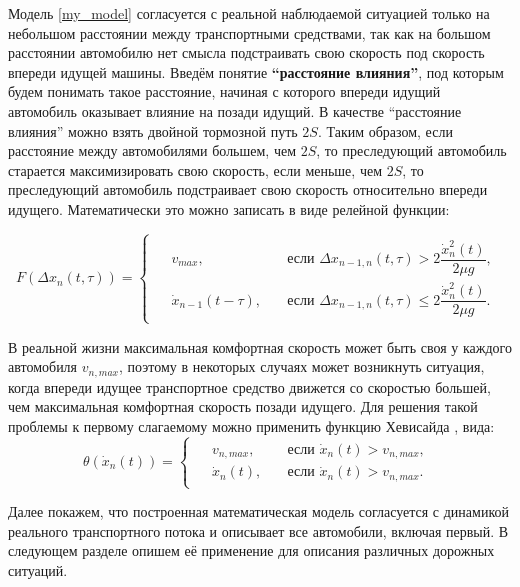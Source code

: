 \documentclass[12pt, a4paper]{extarticle}
\numberwithin{equation}{section}
\numberwithin{figure}{section}
\begin{document}
Модель \eqref{my_model} согласуется с реальной наблюдаемой ситуацией только на небольшом расстоянии между транспортными средствами, так как на большом расстоянии автомобилю нет смысла подстраивать свою скорость под скорость впереди идущей машины. Введём понятие \textbf{``расстояние влияния''}, под которым будем понимать такое расстояние, начиная с которого впереди идущий автомобиль оказывает влияние на позади идущий. В качестве ``расстояние влияния'' можно взять двойной тормозной путь $2S$. Таким образом, если расстояние между автомобилями большем, чем  $2S$, то преследующий автомобиль старается максимизировать свою скорость, если меньше, чем  $2S$, то преследующий автомобиль подстраивает свою скорость относительно впереди идущего. Математически это можно записать в виде релейной функции:

\begin{equation*}
F(\Delta x_{n}(t,\tau))=
\begin{cases}
\begin{split}
&v_{max},\quad &\text{если }\Delta x_{n-1,n}(t,\tau) > 2\dfrac{\dot{x}_n^2(t)}{2\mu g}, \\
&\dot{x}_{n-1}(t-\tau),\quad &\text{если }\Delta x_{n-1,n}(t,\tau) \leq 2\dfrac{\dot{x}_n^2(t)}{2\mu g}.
\end{split}
\end{cases}
\end{equation*}

В реальной жизни максимальная комфортная скорость может быть своя у каждого автомобиля $v_{n,max}$, поэтому в некоторых случаях может возникнуть ситуация, когда впереди идущее транспортное средство движется со скоростью большей, чем максимальная комфортная скорость позади идущего. Для решения такой проблемы к первому слагаемому можно применить функцию Хевисайда \cite{Heaviside_function}, вида:
\begin{equation*}
\theta(\dot{x}_n(t))=
\begin{cases}
\begin{split}
&v_{n,max},\quad &\text{если }\dot{x}_n(t)>v_{n,max}, \\
&\dot{x}_n(t),\quad &\text{если }\dot{x}_n(t)>v_{n,max}.
\end{split}
\end{cases}
\end{equation*}

Далее покажем, что построенная математическая модель согласуется с динамикой реального транспортного потока и описывает все автомобили, включая первый. В следующем разделе опишем её применение для описания различных дорожных ситуаций.
\end{document}
